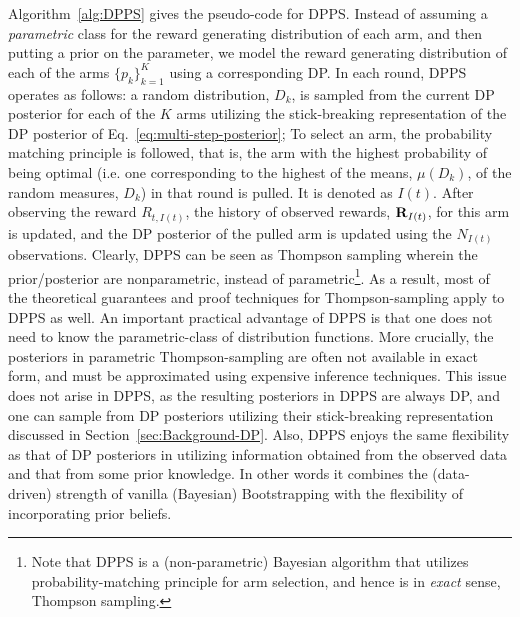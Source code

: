 \documentclass[10pt]{article}
\begin{document}
Algorithm~\ref{alg:DPPS} gives the pseudo-code for DPPS. Instead of assuming a \emph{parametric} class for the reward generating distribution of each arm, and then putting a prior on the parameter, we model the reward generating distribution of each of the arms $\{p_{k}\}_{k=1}^{K}$ using a corresponding DP. In each round, DPPS operates as follows:  a random distribution, $D_{k}$, is sampled from the current DP posterior for each of the $K$ arms utilizing the stick-breaking representation of the DP posterior of Eq.~\ref{eq:multi-step-posterior}; To select an arm, the probability matching principle is followed, that is, the arm with the highest probability of being optimal (i.e. one corresponding to the highest  of the means, $\mu(D_{k})$, of the random measures, $D_{k}$) in that round is pulled. It is denoted as $I(t)$. After observing the reward $R_{t,I(t)}$, 
the history of observed rewards, ${\bf R}_{I(t)}$, for this arm is updated, and the DP posterior of the pulled arm is updated  using the $N_{I(t)}$ observations.  Clearly, DPPS can be seen as Thompson sampling wherein the prior/posterior are nonparametric, instead of parametric\footnote{Note that DPPS is a (non-parametric) Bayesian algorithm that utilizes probability-matching principle for arm selection, and hence is in \textit{exact} sense, Thompson sampling.}. 
As a result, most of the theoretical guarantees and proof techniques for Thompson-sampling apply to DPPS as well. 
An important practical advantage of DPPS is that one does not need to know the parametric-class of distribution functions. More crucially,  the posteriors in parametric Thompson-sampling are often not available in exact form, and must be approximated using expensive inference techniques. This issue does not arise in DPPS, as the resulting posteriors in DPPS are always DP, and one can sample from DP posteriors utilizing their stick-breaking representation discussed in Section~\ref{sec:Background-DP}. Also,  DPPS enjoys the same flexibility as that of DP posteriors  in utilizing information obtained from the observed data and that from some prior knowledge. In other words it  combines the (data-driven) strength of vanilla (Bayesian) Bootstrapping with  the flexibility of incorporating prior beliefs.  
\end{document}

